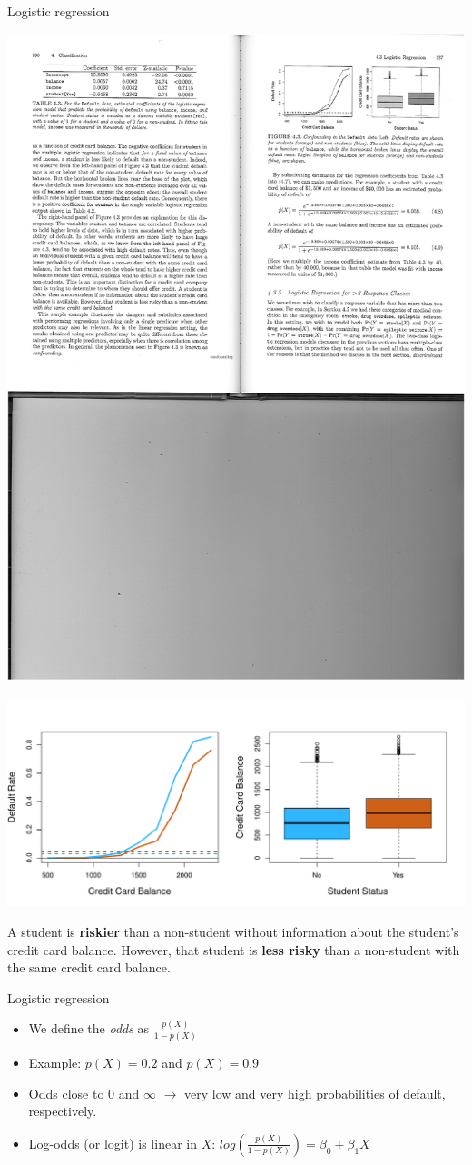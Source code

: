 \documentclass[14pt]{beamer}
\begin{document}
\begin{frame}{Logistic regression}

\centerline{\includegraphics[width=.7\textwidth]{Table3}}

\centerline{\includegraphics[width=.7\textwidth]{4-3}}
\vspace{-.3cm}
{\small A student is \textbf{riskier} than a non-student \alert{without information about the student's credit card balance}. However, that student is \textbf{less risky} than a non-student with the \alert{same credit card balance}.}

\end{frame}



\begin{frame}{Logistic regression}\large

\begin{itemize}
\item We define the \emph{odds} as $\frac{p(X)}{1 - p(X)}$ 
\item Example: $p(X) = 0.2$ and $p(X) = 0.9$
\item Odds close to $0$ and $\infty$ $\rightarrow$ very low and very high probabilities of default, respectively.
\item Log-odds (or logit) is linear in $X$: $log(\frac{p(X)}{1 - p(X)}) = \beta_0 + \beta_1 X$
\end{itemize}

\end{frame}
\end{document}
